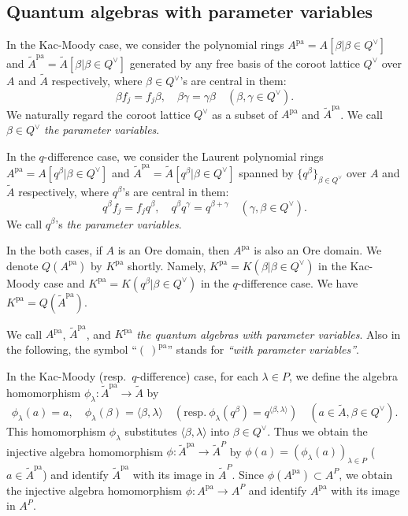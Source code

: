 \documentclass[12pt,twoside]{article}
\newcommand\bra{\langle}
\newcommand\ket{\rangle}
\newcommand\Qv{Q^\vee}
\newcommand\tA{{\widetilde A}}
\newcommand\pa{{\mathrm{pa}}}
\theoremstyle{plain} %
\theoremstyle{definition} %
\theoremstyle{definition} %
\numberwithin{theorem}{section}
\numberwithin{equation}{section}
\numberwithin{figure}{section}
\numberwithin{table}{section}
\begin{document}

\subsection{Quantum algebras with parameter variables}
\label{sec:A^pa}

In the Kac-Moody case, we consider
the polynomial rings 
$A^\pa=A[\beta|\beta\in\Qv]$ and $\tA^\pa=\tA[\beta|\beta\in\Qv]$
generated by any free basis of the coroot lattice $\Qv$ over $A$ and $\tA$ respectively,
where $\beta\in\Qv$'s are central in them:
\begin{equation*}
 \beta f_j = f_j \beta, \quad
 \beta\gamma = \gamma\beta \quad
 (\beta,\gamma\in\Qv).
\end{equation*}
We naturally regard the coroot lattice $\Qv$ 
as a subset of $A^\pa$ and $\tA^\pa$.
We call $\beta\in\Qv$ {\em the parameter variables}.

In the $q$-difference case, we consider
the Laurent polynomial rings 
$A^\pa=A[q^\beta|\beta\in\Qv]$ and
$\tA^\pa=\tA[q^\beta|\beta\in\Qv]$
spanned by $\{q^\beta\}_{\beta\in\Qv}$ 
over $A$ and $\tA$ respectively,
where $q^\beta$'s are central in them:
\begin{equation*}
 q^\beta f_j = f_j q^\beta, \quad
 q^\beta q^\gamma = q^{\beta+\gamma} \quad
 (\gamma,\beta\in\Qv).
\end{equation*}
We call $q^\beta$'s {\em the parameter variables}.

In the both cases, if $A$ is an Ore domain, 
then $A^\pa$ is also an Ore domain.
We denote $Q(A^\pa)$ by $K^\pa$ shortly.
Namely, $K^\pa=K(\beta|\beta\in\Qv)$ in the Kac-Moody case
and $K^\pa=K(q^\beta|\beta\in\Qv)$ in the $q$-difference case.
We have $K^\pa=Q(\tA^\pa)$.

We call $A^\pa$, $\tA^\pa$, and $K^\pa$ 
{\em the quantum algebras with parameter variables}.
Also in the following, 
the symbol ``$(\ )^\pa$'' stands for {\em ``with parameter variables''}.

In the Kac-Moody (resp.\ $q$-difference) case,
for each $\lambda\in P$, we define the algebra homomorphism 
$\phi_\lambda:\tA^\pa\to\tA$ by
\begin{equation*}
 \phi_\lambda(a)=a, \quad
 \phi_\lambda(\beta) = \bra\beta,\lambda\ket \quad
 (\text{resp.}\ \phi_\lambda(q^\beta) = q^{\bra\beta,\lambda\ket}) \quad
 (a\in\tA, \beta\in\Qv).
\end{equation*}
This homomorphism $\phi_\lambda$ 
substitutes $\bra\beta,\lambda\ket$ into $\beta\in\Qv$.
Thus we obtain the injective algebra homomorphism 
$\phi:\tA^\pa\to\tA^P$ by $\phi(a)=(\phi_\lambda(a))_{\lambda\in P}$
($a\in\tA^\pa$) and identify $\tA^\pa$ with its image in $\tA^P$.
Since $\phi(A^\pa)\subset A^P$, we obtain the injective algebra
homomorphism $\phi:A^\pa\to A^P$
and identify $A^\pa$ with its image in $A^P$.
\end{document}
